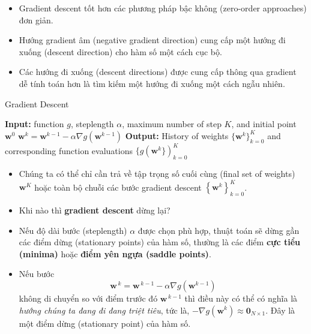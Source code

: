 \documentclass{book}
\begin{document}
\begin{itemize}
    \item Gradient descent tốt hơn các phương pháp bậc không (zero-order approaches) đơn giản.
    \item Hướng gradient âm (negative gradient direction) cung cấp một hướng đi xuống (descent direction) cho hàm số một cách cục bộ.
    \item Các hướng đi xuống (descent directions) được cung cấp thông qua gradient dễ tính toán hơn là tìm kiếm một hướng đi xuống một cách ngẫu nhiên.
\end{itemize}
\begin{algorithm}[H]
    \caption{Gradient Descent}
    \begin{algorithmic}[1]
        \STATE \textbf{Input:} function $g$, steplength $\alpha$, maximum number of step $K$, and initial point $\mathbf{w}^0$
            \STATE $\mathbf{w}^k=\mathbf{w}^{k-1}-\alpha \nabla g(\mathbf{w}^{k-1})$
        \ENDFOR
        \STATE \textbf{Output:} History of weights $\{\mathbf{w}^k\}^{K}_{k=0}$ and corresponding function evaluations  $\{g(\mathbf{w}^k\})^{K}_{k=0}$
    \end{algorithmic}
\end{algorithm}

\begin{itemize}
    \item Chúng ta có thể chỉ cần trả về tập trọng số cuối cùng (final set of weights) $\mathbf{w}^K$ hoặc toàn bộ chuỗi các bước gradient descent $\left\{\mathbf{w}^{k}\right\}_{k=0}^K$.
    \item Khi nào thì \textbf{gradient descent} dừng lại?
    \item Nếu độ dài bước (steplength) $\alpha$ được chọn phù hợp, thuật toán sẽ dừng gần các điểm dừng (stationary points) của hàm số, thường là các điểm \textbf{cực tiểu (minima)} hoặc \textbf{điểm yên ngựa (saddle points)}.
    \item Nếu bước
    \begin{equation*}
        \mathbf{w}^{\,k} = \mathbf{w}^{\,k-1} - \alpha \nabla g\left(\mathbf{w}^{k-1}\right)
    \end{equation*}
    không di chuyển so với điểm trước đó $\mathbf{w}^{\,k-1}$ thì điều này có thể có nghĩa là \textit{hướng chúng ta đang đi đang triệt tiêu}, tức là, $-\nabla g\left(\mathbf{w}^k\right) \approx \mathbf{0}_{N\times 1}$. Đây là một điểm dừng (stationary point) của hàm số.
\end{itemize}
\end{document}
